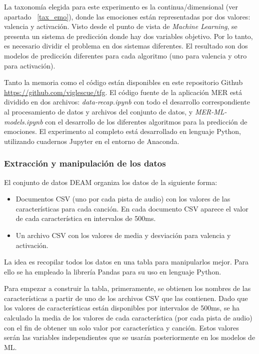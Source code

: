 \documentclass[12pt,a4paper,Spanish]{article}
\begin{document}
La taxonomía elegida para este experimento es la continua/dimensional (ver apartado ~\ref{tax_emo}), donde las emociones están representadas por dos valores: valencia y activación. Visto desde el punto de vista de \textit{Machine Learning}, se presenta un sistema de predicción donde hay dos variables objetivo. Por lo tanto, es necesario dividir el problema en dos sistemas diferentes. El resultado son dos modelos de predicción diferentes para cada algoritmo (uno para valencia y otro para activación).
\newline

Tanto la memoria como el código están disponibles en este repositorio Github \url{https://github.com/viglescue/tfg}. El código fuente de la aplicación MER está dividido en dos archivos: \textit{data-recap.ipynb} con todo el desarrollo correspondiente al procesamiento de datos y archivos del conjunto de datos, y \textit{MER-ML-models.ipynb} con el desarrollo de los diferentes algoritmos para la predicción de emociones. El experimento al completo está desarrollado en lenguaje Python, utilizando cuadernos Jupyter en el entorno de Anaconda. 







\subsubsection{Extracción y manipulación de los datos}
El conjunto de datos DEAM \cite{AlajankiEmoInMusicAnalysis} organiza los datos de la siguiente forma:
\begin{itemize}
	\item Documentos CSV (uno por cada pista de audio) con los valores de las características para cada canción. En cada documento CSV aparece el valor de cada característica en intervalos de 500ms.
	\item Un archivo CSV con los valores de media y desviación para valencia y activación.
\end{itemize}

La idea es recopilar todos los datos en una tabla para manipularlos mejor. Para ello se ha empleado la librería Pandas \cite{mckinney-proc-scipy-2010} para su uso en lenguaje Python.
\newline

Para empezar a construir la tabla, primeramente, se obtienen los nombres de las características a partir de uno de los archivos CSV que las contienen. Dado que los valores de características están disponibles por intervalos de 500ms, se ha calculado la media de los valores de cada característica (por cada pista de audio) con el fin de obtener un solo valor por característica y canción. Estos valores serán las variables independientes que se usarán posteriormente en los modelos de ML.
\newline
\end{document}
